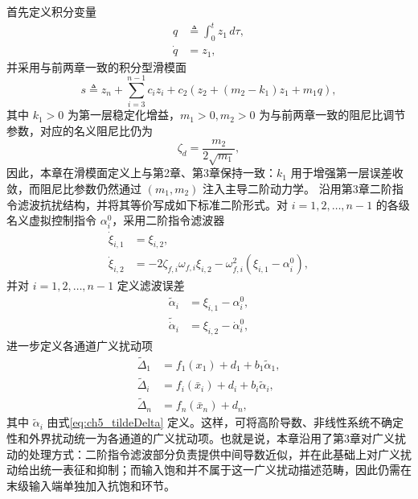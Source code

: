 首先定义积分变量
\begin{subequations}\label{eq:ch5_q}
\begin{align}
  q &\triangleq \int_0^t z_1\,d\tau,\\
  \dot q &= z_1,
\end{align}
\end{subequations}
并采用与前两章一致的积分型滑模面
\begin{equation}\label{eq:ch5_s}
  s \triangleq z_n+\sum_{i=3}^{n-1}c_i z_i+c_2\left(z_2+(m_2-k_1)z_1+m_1q\right),
\end{equation}
其中 $k_1>0$ 为第一层稳定化增益，$m_1>0,m_2>0$ 为与前两章一致的阻尼比调节参数，对应的名义阻尼比仍为
\begin{equation}
  \zeta_d=\frac{m_2}{2\sqrt{m_1}},
\end{equation}
因此，本章在滑模面定义上与第2章、第3章保持一致：$k_1$ 用于增强第一层误差收敛，而阻尼比参数仍然通过 $(m_1,m_2)$ 注入主导二阶动力学。
沿用第3章二阶指令滤波抗扰结构，并将其等价写成如下标准二阶形式。对 $i=1,2,\ldots,n-1$ 的各级名义虚拟控制指令 $\alpha_i^0$，采用二阶指令滤波器
\begin{subequations}\label{eq:ch5_obs_design}
\begin{align}
\dot \xi_{i,1}&=\xi_{i,2},\\
\dot \xi_{i,2}&=-2\zeta_{f,i}\omega_{f,i}\xi_{i,2}-\omega_{f,i}^2(\xi_{i,1}-\alpha_i^0),
\end{align}
\end{subequations}
并对 $i=1,2,\ldots,n-1$ 定义滤波误差
\begin{subequations}\label{eq:ch5_tildeDelta}
\begin{align}
\tilde\alpha_i&=\xi_{i,1}-\alpha_i^0,\\
\tilde{\dot\alpha}_i&=\xi_{i,2}-\dot\alpha_i^0,
\end{align}
\end{subequations}
进一步定义各通道广义扰动项
\begin{subequations}\label{eq:ch5_filter_dist}
\begin{align}
\tilde\Delta_1&=f_1(x_1)+d_1+b_1\tilde\alpha_1,\\
\tilde\Delta_i&=f_i(\bar x_i)+d_i+b_i\tilde\alpha_i,\\
\tilde\Delta_n&=f_n(\bar x_n)+d_n,
\end{align}
\end{subequations}
其中 $\tilde\alpha_i$ 由式\eqref{eq:ch5_tildeDelta} 定义。这样，可将高阶导数、非线性系统不确定性和外界扰动统一为各通道的广义扰动项。也就是说，本章沿用了第3章对广义扰动的处理方式：二阶指令滤波部分负责提供中间导数近似，并在此基础上对广义扰动给出统一表征和抑制；而输入饱和并不属于这一广义扰动描述范畴，因此仍需在末级输入端单独加入抗饱和环节。


